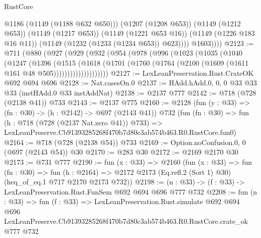 \begin{lexlean}{RustCore}
\begin{coremodule}
                  @1186
                  (@1149 (@1188 @632 @650)))
                (@1207 (@1208 @653))
                (@1149 (@1212 @653))
                (@1149 (@1217 @653))
                (@1149 (@1221 @653 @16))
                (@1149 (@1226 @183 @16 @11))
                (@1149 (@1232 (@1233 (@1234 @653)) @623))))
            @1603))))
@2123 := @711
    (@880
      (@927
        (@929
          (@932
            (@954
              (@978
                (@996
                  (@1023
                    (@1035
                      (@1040
                        (@1247
                          (@1396
                            (@1515
                              (@1618
                                (@1701
                                  (@1760
                                    (@1764 (@2100 (@1609 (@1611 @161 @48 @505))))))))))))))))))))
@2127 := LexLeanPreservation.Rust.CrateOK @692 @694 @696
@2128 := Nat.casesOn.{0}
@2137 := HAdd.hAdd.{0, 0, 0} @33 @33 @33 (instHAdd.{0} @33 instAddNat)
@2138 := @2137 @777
@2142 := @718 (@728 (@2138 @41)) @733
@2143 := @2137 @775
@2160 := @2128
    (fun (y : @33) => (fn : @30) -> (h : @2142) -> @697 (@2143 @41))
    @732
    (fun (fn : @30) =>
    fun (h : @718 (@728 (@2137 Nat.zero @41)) @733) =>
    LexLeanPreserve.Cb91393285268f470b7d80c3ab574b463.R0.RustCore.fun0)
@2164 := @718 (@728 (@2138 @54)) @733
@2169 := Option.noConfusion.{0, 0} (@697 (@2143 @54)) @30
@2170 := @283 @30
@2172 := @2169 @2170 @30
@2173 := @731 @777
@2190 := fun (x : @33) =>
  @2160
    (fun (x : @33) =>
    fun (fn : @30) =>
    fun (h : @2164) => @2172 @2173 (Eq.refl.{2} (Sort 1) @30) (heq_of_eq.{1} @717 @2170 @2173 @732))
@2198 := (n : @33) -> (f : @33) -> LexLeanPreservation.Rust.FunSem @692 @694 @696 @777 @732
@2208 := fun (n : @33) =>
  fun (f : @33) =>
  LexLeanPreservation.Rust.simulate
    @692
    @694
    @696
    LexLeanPreserve.Cb91393285268f470b7d80c3ab574b463.R0.RustCore.crate_ok
    @777
    @732
\end{coremodule}
\end{lexlean}

